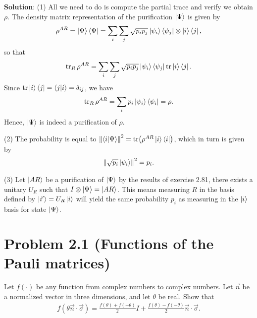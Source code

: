 \documentclass{book}
\begin{document}
    \textbf{Solution}: (1) All we need to do is compute the partial trace and verify we obtain $\rho$. The density matrix representation of the purification $\ket{\Psi}$ is given by
    \begin{align}
        \rho^{AR} = \ket{\Psi}\bra{\Psi} = \sum_i \sum_j \sqrt{p_i p_j} \ket{\psi_i}\bra{\psi_j} \otimes \ket{i}\bra{j},
    \end{align}
    so that 
    \begin{align}
        \tr_R \rho^{AR} = \sum_i \sum_j \sqrt{p_i p_j} \ket{\psi_i}\bra{\psi_j} \tr \ket{i}\bra{j}.
    \end{align}
    Since $\tr \ket{i}\bra{j} = \bra{j}\ket{i} = \delta_{ij}$, we have
    \begin{align}
        \tr_R \rho^{AR} = \sum_i p_i \ket{\psi_i}\bra{\psi_i} = \rho.
    \end{align}
    Hence, $\ket{\Psi}$ is indeed a purification of $\rho$.

    (2) The probability is equal to $\norm{\bra{i} \ket{\Psi}}^2 = \tr (\rho^{AR} \ket{i}\bra{i})$, which in turn is given by
    \begin{align}
        \norm{\sqrt{p_i} \ket{\psi_i}}^2 = p_i.
    \end{align}

    (3) Let $\ket{AR}$ be a purification of $\ket{\Psi}$ by the results of exercise 2.81, there exists a unitary $U_R$ such that $I \otimes \ket{\Psi} = \ket{AR}$. This means measuring $R$ in the basis defined by $\ket{i'} = U_R \ket{i}$ will yield the same probability $p_i$ as measuring in the $\ket{i}$ basis for state $\ket{\Psi}$.

\section*{Problem 2.1 (Functions of the Pauli matrices)}
    Let $f(\cdot)$ be any function from complex numbers to complex numbers. Let $\vec{n}$ be a normalized vector in three dimensions, and let $\theta$ be real. Show that
    \begin{align}
        f(\theta \vec{n} \cdot \vec{\sigma}) = \frac{f(\theta) + f(-\theta)}{2} I + \frac{f(\theta)- f(-\theta)}{2} \vec{n} \cdot \vec{\sigma}.
    \end{align}
\end{document}
